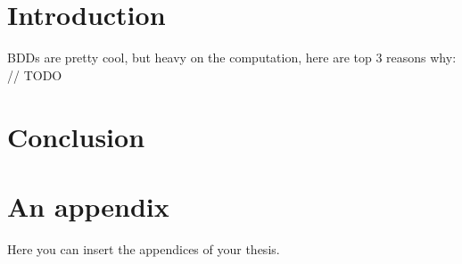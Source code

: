 \documentclass[
  digital,     %
  oneside,     %
  nosansbold,  %
  nocolorbold, %
  lof,         %
  lot,         %
]{fithesis4}
\begin{document}
\chapter*{Introduction}

BDDs are pretty cool, but heavy on the computation, here are top 3 reasons why: // TODO











\chapter{Conclusion}

\printbibliography[heading=bibintoc] %


\appendix %
\chapter{An appendix}
Here you can insert the appendices of your thesis.
\end{document}
